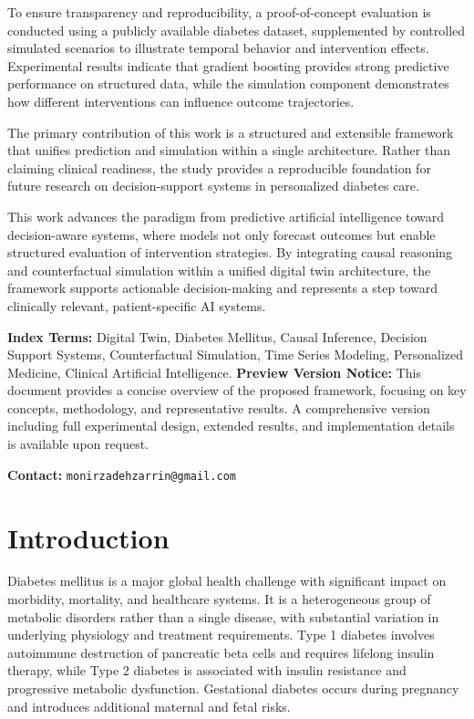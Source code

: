 \documentclass[journal]{IEEEtran}
\begin{document}
To ensure transparency and reproducibility, a proof-of-concept evaluation is conducted using a publicly available diabetes dataset, supplemented by controlled simulated scenarios to illustrate temporal behavior and intervention effects. Experimental results indicate that gradient boosting provides strong predictive performance on structured data, while the simulation component demonstrates how different interventions can influence outcome trajectories.

The primary contribution of this work is a structured and extensible framework that unifies prediction and simulation within a single architecture. Rather than claiming clinical readiness, the study provides a reproducible foundation for future research on decision-support systems in personalized diabetes care.

This work advances the paradigm from predictive artificial intelligence toward decision-aware systems, where models not only forecast outcomes but enable structured evaluation of intervention strategies. By integrating causal reasoning and counterfactual simulation within a unified digital twin architecture, the framework supports actionable decision-making and represents a step toward clinically relevant, patient-specific AI systems.

\vspace{0.6em}
\noindent\textbf{Index Terms:} Digital Twin, Diabetes Mellitus, Causal Inference, Decision Support Systems, Counterfactual Simulation, Time Series Modeling, Personalized Medicine, Clinical Artificial Intelligence.
\vspace{0.8em}
\noindent
\textbf{Preview Version Notice:}
This document provides a concise overview of the proposed framework, focusing on key concepts, methodology, and representative results. 
A comprehensive version including full experimental design, extended results, and implementation details is available upon request.

\vspace{0.3em}
\noindent
\textbf{Contact:} \texttt{monirzadehzarrin@gmail.com}
\section{Introduction}
Diabetes mellitus is a major global health challenge with significant impact on morbidity, mortality, and healthcare systems. It is a heterogeneous group of metabolic disorders rather than a single disease, with substantial variation in underlying physiology and treatment requirements. Type 1 diabetes involves autoimmune destruction of pancreatic beta cells and requires lifelong insulin therapy, while Type 2 diabetes is associated with insulin resistance and progressive metabolic dysfunction. Gestational diabetes occurs during pregnancy and introduces additional maternal and fetal risks.
\end{document}
